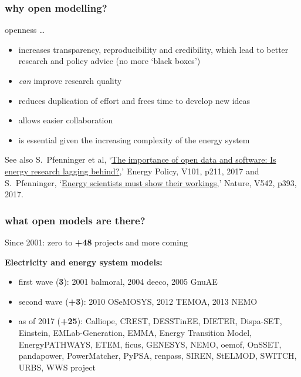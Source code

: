 \documentclass[12pt,aspectratio=169]{beamer}
\let\olditem\item
\renewcommand{\item}{%
\olditem\vspace{5pt}}
\begin{document}
\begin{frame}
  \frametitle{why open modelling?}

  openness \dots
  \begin{itemize}
  \item increases \alert{transparency}, \alert{reproducibility}
    and \alert{credibility}, which lead to better research and policy
    advice  (no more `black boxes')
  \item \emph{can} improve research \alert{quality}
  \item  reduces
    \alert{duplication of effort} and frees time  to develop
    \alert{new ideas}
  \item allows easier \alert{collaboration}
  \item is essential given the increasing \alert{complexity} of the energy system
  \end{itemize}

  \vspace{0.3cm}

  {\tiny See also  S.~Pfenninger et al, `\href{https://doi.org/10.1016/j.enpol.2016.11.046}{The importance of open data and software: Is energy research lagging behind?},' Energy Policy, V101, p211, 2017 and S.~Pfenninger, `\href{https://dx.doi.org/10.1038/542393a}{Energy scientists must show their workings},' Nature, V542, p393, 2017.}

\end{frame}







\begin{frame}
  \frametitle{what open models are there?}

  Since 2001: zero to {\bf +48} projects and more coming

  {\bf Electricity and energy system models:}
  \begin{itemize}
  \item first wave ({\bf 3}): 2001 balmoral, 2004 deeco, 2005 GnuAE
  \item second wave ({\bf +3}): 2010 OSeMOSYS, 2012 TEMOA, 2013 NEMO
   \item  as of 2017 ({\bf +25}): Calliope, CREST, DESSTinEE, DIETER, Dispa-SET, Einstein,
  EMLab-Generation, EMMA, Energy Transition Model, EnergyPATHWAYS,
  ETEM, ficus, GENESYS, NEMO, oemof, OnSSET, pandapower, PowerMatcher,
  PyPSA, renpass, SIREN, StELMOD, SWITCH, URBS, WWS project
  \end{itemize}
\end{frame}
\end{document}
